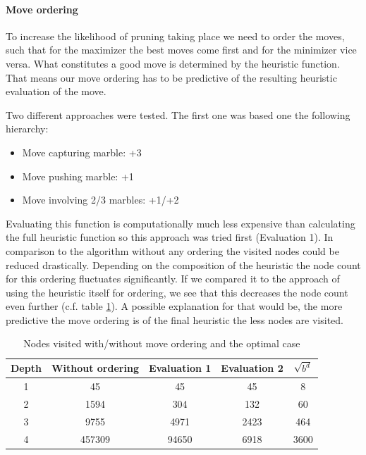 \documentclass{llncs}
\begin{document}
\paragraph{Move ordering}
To increase the likelihood of pruning taking place we need to order the moves, such that for the maximizer the best moves come first and for the minimizer vice versa. What constitutes a good move is determined by the heuristic function. That means our move ordering has to be predictive of the resulting heuristic evaluation of the move.

Two different approaches were tested. The first one was based one the following hierarchy:

\begin{itemize}
  \item Move capturing marble: +3
  \item Move pushing marble: +1
  \item Move involving 2/3 marbles: +1/+2
\end{itemize}

Evaluating this function is computationally much less expensive than calculating the full heuristic function so this approach was tried first (Evaluation 1). In comparison to the algorithm without any ordering the visited nodes could be reduced drastically. Depending on the composition of the heuristic the node count for this ordering fluctuates significantly. If we compared it to the approach of using the heuristic itself for ordering, we see that this decreases the node count even further (c.f. table \ref{node_count}). A possible explanation for that would be, the more predictive the move ordering is of the final heuristic the less nodes are visited.

\begin{table}
  \begin{center}
    \begin{tabular}{ | c | c | c | c | c | }
      \hline
      Depth & Without ordering & Evaluation 1 & Evaluation 2 & $\sqrt{b^d}$ \\
      \hline
      1     & 45               & 45           & 45           & 8            \\
      \hline
      2     & 1594             & 304          & 132          & 60           \\
      \hline
      3     & 9755             & 4971         & 2423         & 464          \\
      \hline
      4     & 457309           & 94650        & 6918         & 3600         \\
      \hline
    \end{tabular}
  \end{center}
  \caption{Nodes visited with/without move ordering and the optimal case}
  \label{node_count}
\end{table}
\end{document}
